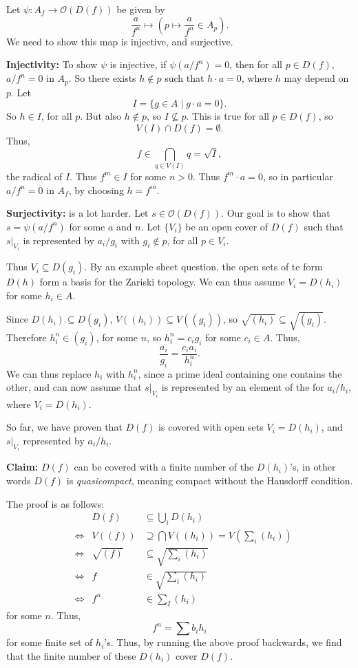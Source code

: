 \documentclass[12pt]{article}
\begin{document}
\begin{proofbox}
	Let $\psi : A_f \to \mathcal{O}(D(f))$ be given by
	\[
	\frac{a}{f^n} \mapsto \left( p \mapsto \frac{a}{f^n} \in A_p \right).
	\]
	We need to show this map is injective, and surjective.

	\textbf{Injectivity:} To show $\psi$ is injective, if $\psi(a/f^n) = 0$, then for all $p \in D(f)$, $a/f^n = 0$ in $A_p$. So there exists $h \not \in p$ such that $h \cdot a = 0$, where $h$ may depend on $p$. Let
	\[
		I = \{g \in A \mid g \cdot a = 0\}.
	\]
	So $h \in I$, for all $p$. But also $h \not \in p$, so $I \not \subseteq p$. This is true for all $p \in D(f)$, so
	\[
	V(I) \cap D(f) = \emptyset.
	\]
	Thus,
	\[
	f \in \bigcap_{q \in V(I)} q = \sqrt I,
	\]
	the radical of $I$. Thus $f^m \in I$ for some $n > 0$. Thus $f^m \cdot a = 0$, so in particular $a/f^n = 0$ in $A_f$, by choosing $h = f^m$.

	\textbf{Surjectivity:} is a lot harder. Let $s \in \mathcal{O}(D(f))$. Our goal is to show that $s = \psi(a/f^n)$ for some $a$ and $n$. Let $\{V_i\}$ be an open cover of $D(f)$ such that $s|_{V_i}$ is represented by $a_i/g_i$ with $g_i \not \in p$, for all $p \in V_i$.

	Thus $V_i \subseteq D(g_i)$. By an example sheet question, the open sets of te form $D(h)$ form a basis for the Zariski topology. We can thus assume $V_i = D(h_i)$ for some $h_i \in A$.

	Since $D(h_i) \subseteq D(g_i)$, $V((h_i)) \subseteq V((g_i))$, so $\sqrt{(h_i)} \subseteq \sqrt{(g_i)}$. Therefore $h_i^n \in (g_i)$, for some $n$, so $h_i^n = c_i g_i$ for some $c_i \in A$. Thus,
	\[
	\frac{a_i}{g_i} = \frac{c_i a_i}{h_i^n}.
	\]
	We can thus replace $h_i$ with $h_i^n$, since a prime ideal containing one contains the other, and can now assume that $s|_{V_i}$ is represented by an element of the for $a_i/h_i$, where $V_i = D(h_i)$.

	So far, we have proven that $D(f)$ is covered with open sets $V_i = D(h_i)$, and $s|_{V_i}$ represented by $a_i/h_i$.

	\textbf{Claim:} $D(f)$ can be covered with a finite number of the $D(h_i)$'s, in other words $D(f)$ is \emph{quasicompact}, meaning compact without the Hausdorff condition.

	The proof is as follows:
	\begin{align*}
	&&	D(f) & \subseteq \bigcup_i D(h_i) \\
	&\iff& V((f)) &\supseteq \bigcap V((h_i)) = V \left( \sum_i (h_i) \right) \\
	&\iff& \sqrt{(f)} & \subseteq \sqrt{ \sum_i (h_i) } \\
	&\iff& f &\in \sqrt{\sum_i (h_i)} \\
	&\iff& f^n &\in \sum_I (h_i)
	\end{align*}
	for some $n$. Thus,
	\[
	f^n = \sum b_i h_i
	\]
	for some finite set of $h_i$'s. Thus, by running the above proof backwards, we find that the finite number of these $D(h_i)$ cover $D(f)$.


\end{proofbox}
\end{document}
